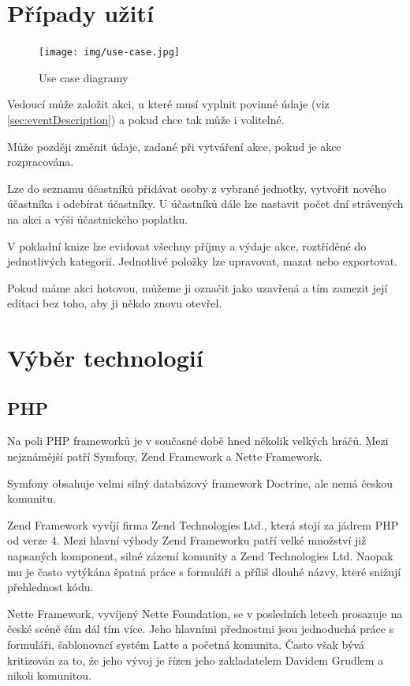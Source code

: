 \documentclass[thesis=B,czech]{FITthesis}[2011/06/14]
\begin{document}
\section{Případy užití}
\begin{figure}[h]\centering
 	\texttt{[image: img/use-case.jpg]}
 	\caption[Případy užití]{Use case diagramy}\label{fig:use-case}
\end{figure}
Vedoucí může založit akci, u které musí vyplnit povinné údaje (viz \ref{sec:eventDescription}) a pokud chce tak může i volitelné.

Může později změnit údaje, zadané při vytváření akce, pokud je akce rozpracována. 

Lze do seznamu účastníků přidávat osoby z vybrané jednotky, vytvořit nového účastníka i odebírat účastníky. U účastníků dále lze nastavit počet dní strávených na akci a výši účastnického poplatku. 

V pokladní knize lze evidovat všechny příjmy a výdaje akce, roztříděné do jednotlivých kategorií. Jednotlivé položky lze upravovat, mazat nebo exportovat.

Pokud máme akci hotovou, můžeme ji označit jako uzavřená a tím zamezit její editaci bez toho, aby ji někdo znovu otevřel.

\section{Výběr technologií}
\subsection{PHP}
Na poli PHP frameworků je v současné době hned několik velkých hráčů. Mezi nejznámější patří Symfony, Zend Framework a Nette Framework.

Symfony obsahuje velmi silný databázový framework Doctrine, ale nemá českou komunitu.

Zend Framework vyvíjí firma Zend Technologies Ltd., která stojí za jádrem PHP od verze 4. Mezi hlavní výhody Zend Frameworku patří velké množství již napsaných komponent, silné zázemí komunity a Zend Technologies Ltd. Naopak mu je často vytýkána špatná práce s formuláři a příliš dlouhé názvy, které snižují přehlednost kódu. 

Nette Framework, vyvíjený Nette Foundation, se v posledních letech prosazuje na české scéně čím dál tím více. Jeho hlavními přednostmi jsou jednoduchá práce s formuláři, šablonovací systém Latte a početná komunita. Často však bývá kritizován za to, že jeho vývoj je řízen jeho zakladatelem Davidem Grudlem a nikoli komunitou.
\end{document}
